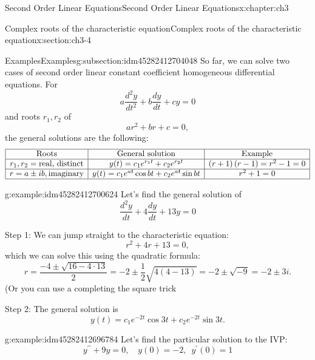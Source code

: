 \documentclass[oneside,10pt,]{book}
\numberwithin{equation}{section}
\numberwithin{equation}{section}
\newcommand{\amp}{&}
\begin{document}
\begin{chapterptx}{Second Order Linear Equations}{}{Second Order Linear Equations}{}{}{x:chapter:ch3}
\begin{sectionptx}{Complex roots of the characteristic equation}{}{Complex roots of the characteristic equation}{}{}{x:section:ch3-4}
\begin{subsectionptx}{Examples}{}{Examples}{}{}{g:subsection:idm45282412704048}
So far, we can solve two cases of second order linear constant coefficient homogeneous differential equations. For%
\begin{equation*}
a\frac{d^{2}y}{dt^{2}}+b\frac{dy}{dt}+cy=0
\end{equation*}
and roots \(r_1, r_2\) of%
\begin{equation*}
ar^{2}+br+c=0,
\end{equation*}
the general solutions are the following:%
\begin{equation*}
\begin{array}{|c|c|c|}
\hline
\text{Roots} \amp \text{General solution} \amp \text{Example}\\
\hline
r_{1},r_{2}= \text{real, distinct} \amp y(t)=c_{1}e^{r_{1}t}+c_{2}e^{r_{2}t} \amp \left(r+1\right)\left(r-1\right)=r^{2}-1=0\\
\hline
r=a \pm ib, \text{imaginary} \amp y(t)=c_{1}e^{a t}\cos b t+c_{2}e^{a t}\sin b t \amp r^{2}+1=0\\
\hline
\end{array}
\end{equation*}
%
\begin{example}{}{g:example:idm45282412700624}%
Let's find the general solution of%
\begin{equation*}
\frac{d^{2}y}{dt}+4\frac{dy}{dt}+13y=0
\end{equation*}
%
\par
Step 1: We can jump straight to the characteristic equation:%
\begin{equation*}
r^{2}+4r+13=0,
\end{equation*}
which we can solve this using the quadratic formula:%
\begin{equation*}
r=\frac{-4\pm\sqrt{16-4\cdot13}}{2}=-2\pm\frac{1}{2}\sqrt{4(4-13)}=-2\pm\sqrt{-9}=-2\pm3i.
\end{equation*}
(Or you can use a completing the square trick%
\par
Step 2: The general solution is%
\begin{equation*}
y(t)=c_{1}e^{-2t}\cos3t+c_{2}e^{-2t}\sin3t.
\end{equation*}
%
\end{example}
\begin{example}{}{g:example:idm45282412696784}%
Let's find the particular solution to the IVP:%
\begin{equation*}
y^{\prime\prime}+9y=0,\,\,\,\,\,\,y(0)=-2,\,\,\,y^{\prime}(0)=1
\end{equation*}
%
\par

\end{example}
\end{subsectionptx}
\end{sectionptx}
\end{chapterptx}
\end{document}
